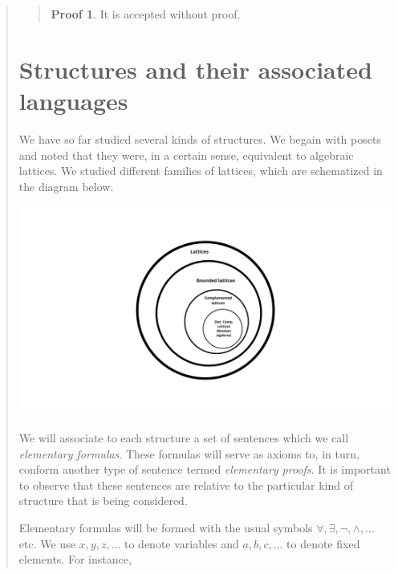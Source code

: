 \documentclass[a4paper, 12pt]{article}
\theoremstyle{definition}
\theoremstyle{definition}
\theoremstyle{definition}
\newtheorem{pro}{Proof}
\begin{document}
\begin{quote}
\small
\begin{quote}

\begin{pro}
    It is accepted without proof.
\end{pro}

\end{quote}
\normalsize


\pagebreak 

\section{Structures and their associated languages}

We have so far studied several kinds of structures. We begain with posets and
noted that they were, in a certain sense, equivalent to algebraic lattices. We 
studied different families of lattices, which are schematized in the diagram 
below.

\includegraphics[scale=0.35]{latticeRings}

We will associate to each structure a set of sentences which we call
\textit{elementary formulas}. These formulas will serve as axioms to, in turn,
conform another type of sentence termed \textit{elementary proofs}. It is
important to observe that these sentences are relative to the particular kind of
structure that is being considered.

Elementary formulas will be formed with the usual symbols $\forall , \exists , \neg, \land , \ldots$ 
etc. We use $x, y, z,\ldots$ to denote variables and $a, b, c, \ldots$ to denote 
fixed elements. For instance, 


\end{quote}
\end{document}
